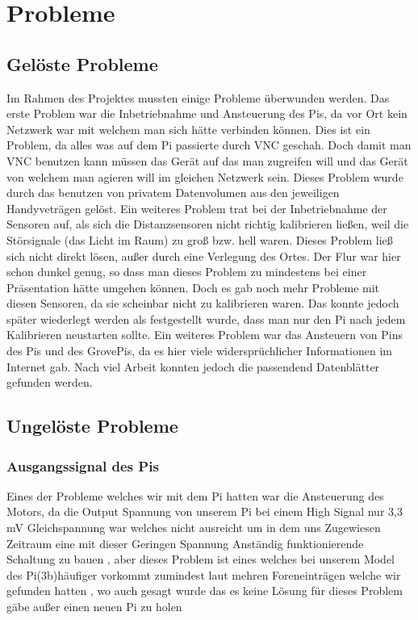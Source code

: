 \documentclass[notitlepage]{report}
\begin{document}
\section{Probleme}

\subsection{Gel\"{o}ste Probleme}

Im Rahmen des Projektes mussten einige Probleme \"{u}berwunden werden. Das erste Problem war die Inbetriebnahme und Ansteuerung des Pis, da vor Ort kein Netzwerk war mit welchem man sich h\"{a}tte verbinden k\"{o}nnen. Dies ist ein Problem, da alles was auf dem Pi passierte durch VNC geschah. Doch damit man VNC benutzen kann m\"{u}ssen das Ger\"{a}t auf das man zugreifen will und das Ger\"{a}t von welchem man agieren will im gleichen Netzwerk sein. Dieses Problem wurde durch das benutzen von privatem Datenvolumen aus den jeweiligen Handyvetr\"{a}gen gel\"{o}st. Ein weiteres Problem trat bei der Inbetriebnahme der Sensoren auf, als sich die Distanzsensoren nicht richtig kalibrieren lie{\ss}en, weil die St\"{o}rsignale (das Licht im Raum) zu gro{\ss} bzw. hell waren. Dieses Problem lie{\ss} sich nicht direkt l\"{o}sen, au{\ss}er durch eine Verlegung des Ortes. Der Flur war hier schon dunkel genug, so dass man dieses Problem zu mindestens bei einer Pr\"{a}sentation h\"{a}tte umgehen k\"{o}nnen. Doch es gab noch mehr Probleme mit diesen Sensoren, da sie scheinbar nicht zu kalibrieren waren. Das konnte jedoch sp\"{a}ter wiederlegt werden als festgestellt wurde, dass man nur den Pi nach jedem Kalibrieren neustarten sollte. Ein weiteres Problem war das Ansteuern von Pins des Pis und des GrovePis, da es hier viele widerspr\"{u}chlicher Informationen im Internet gab. Nach viel Arbeit konnten jedoch die passendend Datenbl\"{a}tter gefunden werden. 

\subsection{Ungel\"{o}ste Probleme}

\subsubsection{Ausgangssignal des Pis}

Eines der Probleme welches wir mit dem Pi hatten war die Ansteuerung des Motors, da die Output Spannung von unserem Pi bei einem High Signal nur 3,3 mV Gleichspannung war welches nicht ausreicht um in dem uns Zugewiesen Zeitraum eine mit dieser Geringen Spannung Anst\"{a}ndig funktionierende Schaltung zu bauen , aber dieses Problem ist eines welches bei unserem Model des Pi(3b)h\"{a}ufiger vorkommt zumindest laut mehren Foreneintr\"{a}gen welche wir gefunden hatten , wo auch gesagt wurde das es keine L\"{o}sung f\"{u}r dieses Problem g\"{a}be au{\ss}er einen neuen Pi zu holen 
\end{document}
